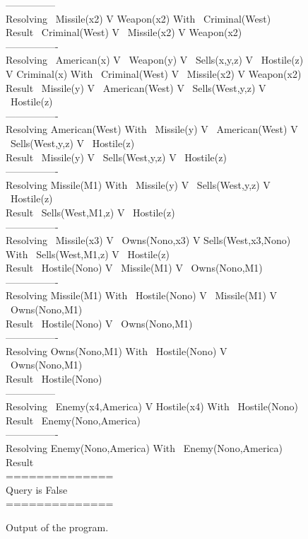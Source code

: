 \documentclass{article}                     %
\begin{document}
	\begin{figure}[H]
		---------------\\
		Resolving    ~Missile(x2) V Weapon(x2)   With     ~Criminal(West) \\
		Result      ~Criminal(West) V ~Missile(x2) V Weapon(x2) \\
		----------------\\
		Resolving    ~American(x) V ~Weapon(y) V ~Sells(x,y,z) V ~Hostile(z) V Criminal(x)   With     ~Criminal(West) V ~Missile(x2) V Weapon(x2) \\
		Result      ~Missile(y) V ~American(West) V ~Sells(West,y,z) V ~Hostile(z) \\
		----------------\\
		Resolving    American(West)   With     ~Missile(y) V ~American(West) V ~Sells(West,y,z) V ~Hostile(z) \\
		Result      ~Missile(y) V ~Sells(West,y,z) V ~Hostile(z) \\
		----------------\\
		Resolving    Missile(M1)   With     ~Missile(y) V ~Sells(West,y,z) V ~Hostile(z) \\
		Result      ~Sells(West,M1,z) V ~Hostile(z) \\
		----------------\\
		Resolving    ~Missile(x3) V ~Owns(Nono,x3) V Sells(West,x3,Nono)   With     ~Sells(West,M1,z) V ~Hostile(z) \\
		Result      ~Hostile(Nono) V ~Missile(M1) V ~Owns(Nono,M1) \\
		----------------\\
		Resolving    Missile(M1)   With     ~Hostile(Nono) V ~Missile(M1) V ~Owns(Nono,M1) \\
		Result      ~Hostile(Nono) V ~Owns(Nono,M1) \\
		----------------\\
		Resolving    Owns(Nono,M1)   With     ~Hostile(Nono) V ~Owns(Nono,M1) \\
		Result      ~Hostile(Nono) \\
		---------------\\
		Resolving    ~Enemy(x4,America) V Hostile(x4)   With     ~Hostile(Nono) \\
		Result      ~Enemy(Nono,America) \\
		----------------\\
		Resolving    Enemy(Nono,America)   With     ~Enemy(Nono,America) \\
		Result      \\
		==============\\
		Query is False\\
		==============
		\caption{Output of the program.}
		\label{fig:west}
	\end{figure}
	
\end{document}
